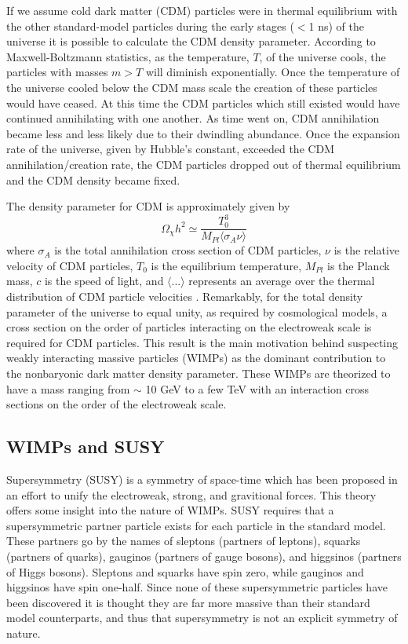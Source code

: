 \documentclass[a4paper,12pt]{article}
\begin{document}
If we assume cold dark matter (CDM) particles were in thermal equilibrium with the other standard-model particles during the early stages ($<$1 ns) of the universe it is possible to calculate the CDM density parameter.  According to Maxwell-Boltzmann statistics, as the temperature, $T$, of the universe cools, the particles with masses $m > T$ will diminish exponentially.  Once the temperature of the universe cooled below the CDM mass scale the creation of these particles would have ceased.  At this time the CDM particles which still existed would have continued annihilating with one another.  As time went on, CDM annihilation became less and less likely due to their dwindling abundance.  Once the expansion rate of the universe, given by Hubble's constant, exceeded the CDM annihilation/creation rate, the CDM particles dropped out of thermal equilibrium and the CDM density became fixed.  

The density parameter for CDM is approximately given by
\[\Omega_\chi h^2 \simeq \frac{T_0^3}{M_{Pl} \langle \sigma_A \nu \rangle} \]
where $\sigma_A$ is the total annihilation cross section of CDM particles, $\nu$ is the relative velocity of CDM particles, $T_0$ is the equilibrium temperature, $M_{Pl}$ is the Planck mass, $c$ is the speed of light, and $\langle ... \rangle$ represents an average over the thermal distribution of CDM particle velocities \cite{Kolb,Jungman}. Remarkably, for the total density parameter of the universe to equal unity, as required by cosmological models, a cross section on the order of particles interacting on the electroweak scale is required for CDM particles. This result is the main motivation behind suspecting weakly interacting massive particles (WIMPs) as the dominant contribution to the nonbaryonic dark matter density parameter.  These WIMPs are theorized to have a mass ranging from $\sim$ 10 GeV to a few TeV with an interaction cross sections on the order of the electroweak scale.  

\subsection{WIMPs and SUSY}

Supersymmetry (SUSY) is a symmetry of space-time which has been proposed in an effort to unify the electroweak, strong, and gravitional forces.  This theory offers some insight into the nature of WIMPs.  SUSY requires that a supersymmetric partner particle exists for each particle in the standard model.  These partners go by the names of sleptons (partners of leptons), squarks (partners of quarks), gauginos (partners of gauge bosons), and higgsinos (partners of Higgs bosons).  Sleptons and squarks have spin zero, while gauginos and higgsinos have spin one-half.  Since none of these supersymmetric particles have been discovered it is thought they are far more massive than their standard model counterparts, and thus that supersymmetry is not an explicit symmetry of nature.
  
\end{document}
